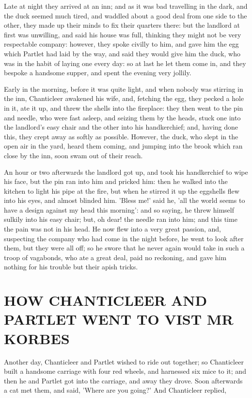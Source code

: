 \documentclass[12pt]{book}
\begin{document}
Late at night they arrived at an inn; and as it was bad travelling in
the dark, and the duck seemed much tired, and waddled about a good
deal from one side to the other, they made up their minds to fix their
quarters there: but the landlord at first was unwilling, and said his
house was full, thinking they might not be very respectable company:
however, they spoke civilly to him, and gave him the egg which Partlet
had laid by the way, and said they would give him the duck, who was in
the habit of laying one every day: so at last he let them come in, and
they bespoke a handsome supper, and spent the evening very jollily.

Early in the morning, before it was quite light, and when nobody was
stirring in the inn, Chanticleer awakened his wife, and, fetching the
egg, they pecked a hole in it, ate it up, and threw the shells into
the fireplace: they then went to the pin and needle, who were fast
asleep, and seizing them by the heads, stuck one into the landlord's
easy chair and the other into his handkerchief; and, having done this,
they crept away as softly as possible. However, the duck, who slept in
the open air in the yard, heard them coming, and jumping into the
brook which ran close by the inn, soon swam out of their reach.

An hour or two afterwards the landlord got up, and took his
handkerchief to wipe his face, but the pin ran into him and pricked
him: then he walked into the kitchen to light his pipe at the fire,
but when he stirred it up the eggshells flew into his eyes, and almost
blinded him. 'Bless me!' said he, 'all the world seems to have a
design against my head this morning': and so saying, he threw himself
sulkily into his easy chair; but, oh dear! the needle ran into him;
and this time the pain was not in his head. He now flew into a very
great passion, and, suspecting the company who had come in the night
before, he went to look after them, but they were all off; so he swore
that he never again would take in such a troop of vagabonds, who ate a
great deal, paid no reckoning, and gave him nothing for his trouble
but their apish tricks.


\section[HOW CHANTICLEER AND PARTLET WENT TO\ldots]{HOW CHANTICLEER AND PARTLET WENT TO VIST MR KORBES}

Another day, Chanticleer and Partlet wished to ride out together; so
Chanticleer built a handsome carriage with four red wheels, and
harnessed six mice to it; and then he and Partlet got into the
carriage, and away they drove. Soon afterwards a cat met them, and
said, 'Where are you going?' And Chanticleer replied,
\end{document}
